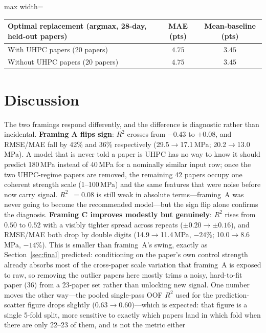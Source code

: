 \documentclass[11pt]{article}
\newcommand{\R}{$R^2$}
\begin{document}
\begin{center}\small
\begin{adjustbox}{max width=\linewidth}
\begin{tabular}{lcc}
\toprule
\textbf{Optimal replacement} (argmax, 28-day, held-out papers) & MAE (pts) & Mean-baseline (pts) \\
\midrule
With UHPC papers (20 papers) & $4.75$ & $3.45$ \\
Without UHPC papers (20 papers) & $4.75$ & $3.45$ \\
\bottomrule
\end{tabular}
\end{adjustbox}
\end{center}


\section{Discussion}
\label{sec:part2-discussion}
The two framings respond differently, and the difference is diagnostic rather than
incidental. \textbf{Framing A flips sign}: \R{} crosses from $-0.43$ to $+0.08$, and
RMSE/MAE fall by 42\% and 36\% respectively (29.5$\to$17.1\,MPa; 20.2$\to$13.0\,MPa). A
model that is never told a paper is UHPC has no way to know it should predict
180\,MPa instead of 40\,MPa for a nominally similar input row; once the two UHPC-regime
papers are removed, the remaining 42 papers occupy one coherent strength scale
(1--100\,MPa) and the same features that were noise before now carry signal. \R{}~$=0.08$
is still weak in absolute terms---framing~A was never going to become the recommended
model---but the sign flip alone confirms the diagnosis.
\textbf{Framing C improves modestly but genuinely}: \R{} rises from $0.50$ to $0.52$
with a visibly tighter spread across repeats ($\pm0.20\to\pm0.16$), and RMSE/MAE both
drop by double digits (14.9$\to$11.4\,MPa, $-24\%$; 10.0$\to$8.6\,MPa, $-14\%$). This is
smaller than framing~A's swing, exactly as Section~\ref{sec:final} predicted:
conditioning on the paper's own control strength already absorbs most of the
cross-paper scale variation that framing~A is exposed to raw, so removing the outlier
papers here mostly trims a noisy, hard-to-fit paper (36) from a 23-paper set rather than
unlocking new signal. One number moves the other way---the pooled single-pass OOF
\R{} used for the prediction-scatter figure drops slightly ($0.63\to0.60$)---which is
expected: that figure is a single 5-fold split, more sensitive to exactly which papers
land in which fold when there are only 22--23 of them, and is not the metric either
\end{document}
